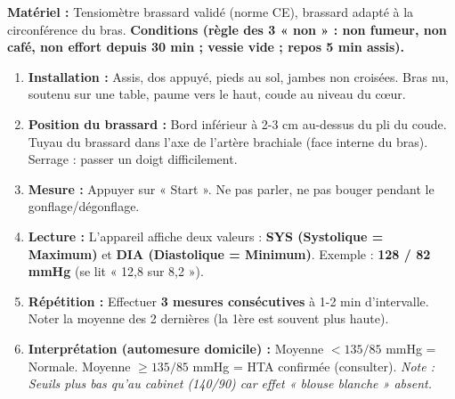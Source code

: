 \documentclass[11pt]{article}
\begin{document}
\begin{methode}
\textbf{Matériel :} Tensiomètre brassard validé (norme CE), brassard adapté à la circonférence du bras.
\textbf{Conditions (règle des 3 « non » : non fumeur, non café, non effort depuis 30 min ; vessie vide ; repos 5 min assis).}
\begin{enumerate}
    \item \textbf{Installation :} Assis, dos appuyé, pieds au sol, jambes non croisées. Bras nu, soutenu sur une table, paume vers le haut, coude au niveau du cœur.
    \item \textbf{Position du brassard :} Bord inférieur à 2-3 cm au-dessus du pli du coude. Tuyau du brassard dans l'axe de l'artère brachiale (face interne du bras). Serrage : passer un doigt difficilement.
    \item \textbf{Mesure :} Appuyer sur « Start ». Ne pas parler, ne pas bouger pendant le gonflage/dégonflage.
    \item \textbf{Lecture :} L'appareil affiche deux valeurs : \textbf{SYS (Systolique = Maximum)} et \textbf{DIA (Diastolique = Minimum)}. Exemple : \textbf{128 / 82 mmHg} (se lit « 12,8 sur 8,2 »).
    \item \textbf{Répétition :} Effectuer \textbf{3 mesures consécutives} à 1-2 min d'intervalle. Noter la moyenne des 2 dernières (la 1ère est souvent plus haute).
    \item \textbf{Interprétation (automesure domicile) :} Moyenne $< 135/85$ mmHg = Normale. Moyenne $\ge 135/85$ mmHg = HTA confirmée (consulter). \textit{Note : Seuils plus bas qu'au cabinet (140/90) car effet « blouse blanche » absent.}
\end{enumerate}
\end{methode}
\end{document}
